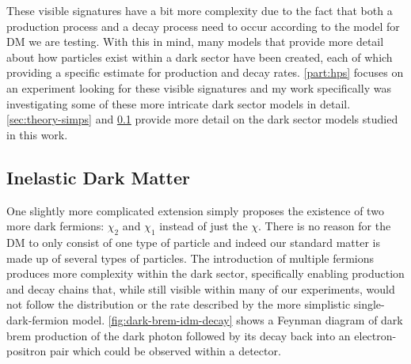 These visible signatures have a bit more complexity due to the fact that both a production process
and a decay process need to occur according to the model for DM we are testing. With this in mind,
many models that provide more detail about how particles exist within a dark sector have been
created, each of which providing a specific estimate for production and decay rates.
\cref{part:hps} focuses on an experiment looking for these visible signatures and my work
specifically was investigating some of these more intricate dark sector models in detail.
\cref{sec:theory-simps} and \cref{sec:theory-idm} provide more detail on the dark sector models
studied in this work.

\subsection{Inelastic Dark Matter}
\label{sec:theory-idm}

One slightly more complicated extension simply proposes the existence of two more dark fermions:
\(\chi_2\) and \(\chi_1\) instead of just the \(\chi\). There is no reason for the DM to only
consist of one type of particle and indeed our standard matter is made up of several types of
particles. The introduction of multiple fermions produces more complexity within the
dark sector, specifically enabling production and decay chains that, while still visible within
many of our experiments, would not follow the distribution or the rate described by the more
simplistic single-dark-fermion model. \cref{fig:dark-brem-idm-decay} shows a Feynman diagram of
dark brem production of the dark photon followed by its decay back into an electron-positron
pair which could be observed within a detector.

